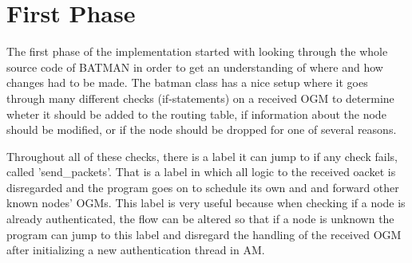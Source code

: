 \section{First Phase}
The first phase of the implementation started with looking through the whole
source code of BATMAN in order to get an understanding of where and how changes
had to be made. The batman class has a nice setup where it goes through many
different checks (if-statements) on a received \ac{OGM} to determine wheter it
should be added to the routing table, if information about the node should be
modified, or if the node should be dropped for one of several reasons.

Throughout all of these checks, there is a label it can jump to if any check
fails, called 'send\_packets'. That is a label in which all logic to the
received oacket is disregarded and the program goes on to schedule its own and and
forward other known nodes' \acp{OGM}. This label is very useful because when
checking if a node is already authenticated, the flow can be altered so that if
a node is unknown the program can jump to this label and disregard the handling
of the received \ac{OGM} after initializing a new authentication thread in
\ac{AM}.
